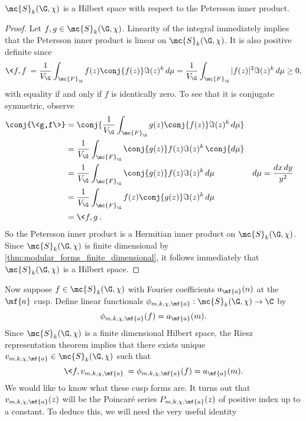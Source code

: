     \begin{proposition}\label{prop:Petersson_inner_product_hermitian_holomorphic}
      $\mc{S}_{k}(\G,\chi)$ is a Hilbert space with respect to the Petersson inner product.
    \end{proposition}
    \begin{proof}
      Let $f,g \in \mc{S}_{k}(\G,\chi)$. Linearity of the integral immediately implies that the Petersson inner product is linear on $\mc{S}_{k}(\G,\chi)$. It is also positive definite since
      \[
        \<f,f\> = \frac{1}{V_{\G}}\int_{\mc{F}_{\G}}f(z)\conj{f(z)}\Im(z)^{k}\,d\mu = \frac{1}{V_{\G}}\int_{\mc{F}_{\G}}|f(z)|^{2}\Im(z)^{k}\,d\mu \ge 0,
      \]
      with equality if and only if $f$ is identically zero. To see that it is conjugate symmetric, observe
      \begin{align*}
        \conj{\<g,f\>} &= \conj{\frac{1}{V_{\G}}\int_{\mc{F}_{\G}}g(z)\conj{f(z)}\Im(z)^{k}\,d\mu} \\
        &= \frac{1}{V_{\G}}\int_{\mc{F}_{\G}}\conj{g(z)}f(z)\Im(z)^{k}\,\conj{d\mu} \\
        &= \frac{1}{V_{\G}}\int_{\mc{F}_{\G}}\conj{g(z)}f(z)\Im(z)^{k}\,d\mu && \text{$d\mu = \frac{dx\,dy}{y^{2}}$} \\
        &= \frac{1}{V_{\G}}\int_{\mc{F}_{\G}}f(z)\conj{g(z)}\Im(z)^{k}\,d\mu \\
        &= \<f,g\>.
      \end{align*}
      So the Petersson inner product is a Hermitian inner product on $\mc{S}_{k}(\G,\chi)$. Since $\mc{S}_{k}(\G,\chi)$ is finite dimensional by \cref{thm:modular_forms_finite_dimensional}, it follows immediately that $\mc{S}_{k}(\G,\chi)$ is a Hilbert space.
    \end{proof}

    Now suppose $f \in \mc{S}_{k}(\G,\chi)$ with Fourier coefficients $a_{\mf{a}}(n)$ at the $\mf{a}$ cusp. Define linear functionals $\phi_{m,k,\chi,\mf{a}}:\mc{S}_{k}(\G,\chi) \to \C$ by 
    \[
      \phi_{m,k,\chi,\mf{a}}(f) = a_{\mf{a}}(m).
    \]
    Since $\mc{S}_{k}(\G,\chi)$ is a finite dimensional Hilbert space, the Riesz representation theorem implies that there exists unique $v_{m,k,\chi,\mf{a}} \in \mc{S}_{k}(\G,\chi)$ such that
    \[
      \<f,v_{m,k,\chi,\mf{a}}\> = \phi_{m,k,\chi,\mf{a}}(f) = a_{\mf{a}}(m).
    \]
    We would like to know what these cusp forms are. It turns out that $v_{m,k,\chi,\mf{a}}(z)$ will be the Poincar\'e series $P_{m,k,\chi,\mf{a}}(z)$ of positive index up to a constant. To deduce this, we will need the very useful identity

